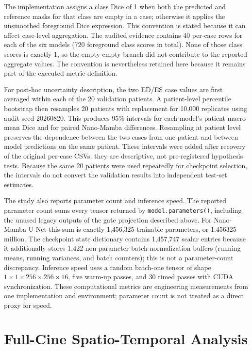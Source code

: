 The implementation assigns a class Dice of 1 when both the predicted and reference masks for that class are empty in a case; otherwise it applies the unsmoothed foreground Dice expression. This convention is stated because it can affect case-level aggregation. The audited evidence contains 40 per-case rows for each of the six models (720 foreground class scores in total). None of those class scores is exactly 1, so the empty-empty branch did not contribute to the reported aggregate values. The convention is nevertheless retained here because it remains part of the executed metric definition.

For post-hoc uncertainty description, the two ED/ES case values are first averaged within each of the 20 validation patients. A patient-level percentile bootstrap then resamples 20 patients with replacement for 10,000 replicates using audit seed 20260820. This produces 95\% intervals for each model's patient-macro mean Dice and for paired Nano-Mamba differences. Resampling at patient level preserves the dependence between the two cases from one patient and between model predictions on the same patient. These intervals were added after recovery of the original per-case CSVs; they are descriptive, not pre-registered hypothesis tests. Because the same 20 patients were used repeatedly for checkpoint selection, the intervals do not convert the validation results into independent test-set estimates.

The study also reports parameter count and inference speed. The reported
parameter count sums every tensor returned by \texttt{model.parameters()},
including the unused legacy outputs of the gate projection described above.
For Nano-Mamba U-Net this sum is exactly 1,456,325 trainable parameters, or
1.456325 million. The checkpoint state dictionary contains 1,457,747 scalar
entries because it additionally stores 1,422 non-parameter batch-normalization
buffers (running means, running variances, and batch counters); this is not a
parameter-count discrepancy. Inference speed uses a random batch-one tensor of
shape $1\times1\times256\times256\times16$, five warm-up passes, and 30 timed
passes with CUDA synchronization. These computational metrics are engineering
measurements from one implementation and environment; parameter count is not
treated as a direct proxy for speed.

\section{Full-Cine Spatio-Temporal Analysis}
